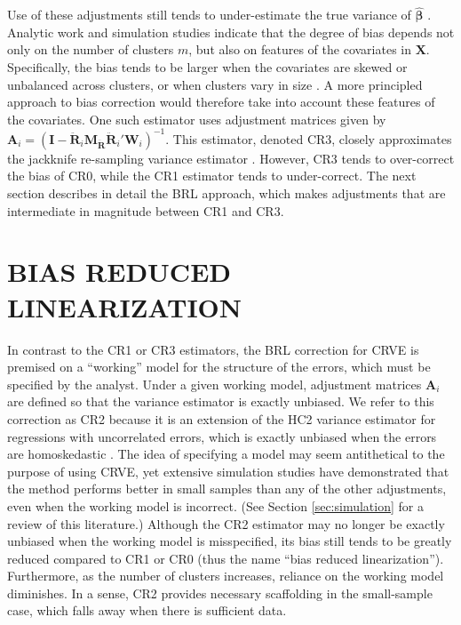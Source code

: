 \documentclass[12pt]{article}
\newcommand{\bm}{\mathbf}
\newcommand{\bs}{\boldsymbol}
\begin{document}
Use of these adjustments still tends to under-estimate the true variance of $\hat{\bs\beta}$ \citep{Cameron2015practitioners}. 
Analytic work and simulation studies indicate that the degree of bias depends not only on the number of clusters $m$, but also on features of the covariates in $\bm{X}$. Specifically, 
the bias tends to be larger when the covariates are skewed or unbalanced across clusters, or when clusters vary in size \citep{Carter2013asymptotic, MacKinnon2013thirty}. 
A more principled approach to bias correction would therefore take into account these features of the covariates. 
One such estimator uses adjustment matrices given by $\bm{A}_i = \left(\bm{I} - \bm{\ddot{R}}_i \bm{M_{\ddot{R}}}\bm{\ddot{R}}_i'\bm{W}_i\right)^{-1}$. This estimator, denoted CR3, closely approximates the jackknife re-sampling variance estimator \citep{Bell2002bias, Mancl2001covariance}.  
However, CR3 tends to over-correct the bias of CR0, while the CR1 estimator tends to under-correct. 
The next section describes in detail the BRL approach, which makes adjustments that are intermediate in magnitude between CR1 and CR3. 


\section{BIAS REDUCED LINEARIZATION}
\label{sec:BRL}

In contrast to the CR1 or CR3 estimators, the BRL correction for CRVE is premised on a ``working'' model for the structure of the errors, which must be specified by the analyst. 
Under a given working model, adjustment matrices $\bm{A}_i$ are defined so that the variance estimator is exactly unbiased.
We refer to this correction as CR2 because it is an extension of the HC2 variance estimator for regressions with uncorrelated errors, which is exactly unbiased when the errors are homoskedastic \citep{MacKinnon1985some}.
The idea of specifying a model may seem antithetical to the purpose of using CRVE, yet extensive simulation studies have demonstrated that the method performs better in small samples than any of the other adjustments, even when the working model is incorrect. (See Section \ref{sec:simulation} for a review of this literature.) 
Although the CR2 estimator may no longer be exactly unbiased when the working model is misspecified, its bias still tends to be greatly reduced compared to CR1 or CR0 (thus the name ``bias reduced linearization''). Furthermore, as the number of clusters increases, reliance on the working model diminishes. 
In a sense, CR2 provides necessary scaffolding in the small-sample case, which falls away when there is sufficient data.
\end{document}
